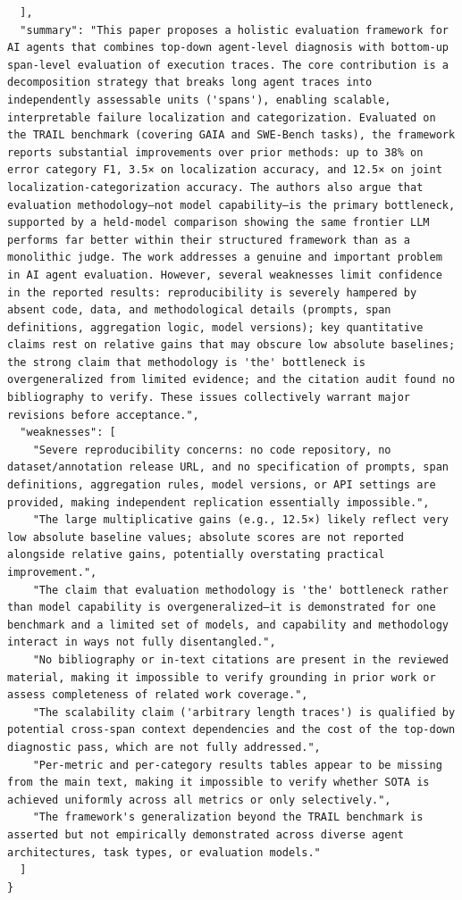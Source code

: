 \documentclass[11pt]{article}
\begin{document}
\begin{verbatim}
  ],
  "summary": "This paper proposes a holistic evaluation framework for AI agents that combines top-down agent-level diagnosis with bottom-up span-level evaluation of execution traces. The core contribution is a decomposition strategy that breaks long agent traces into independently assessable units ('spans'), enabling scalable, interpretable failure localization and categorization. Evaluated on the TRAIL benchmark (covering GAIA and SWE-Bench tasks), the framework reports substantial improvements over prior methods: up to 38% on error category F1, 3.5× on localization accuracy, and 12.5× on joint localization-categorization accuracy. The authors also argue that evaluation methodology—not model capability—is the primary bottleneck, supported by a held-model comparison showing the same frontier LLM performs far better within their structured framework than as a monolithic judge. The work addresses a genuine and important problem in AI agent evaluation. However, several weaknesses limit confidence in the reported results: reproducibility is severely hampered by absent code, data, and methodological details (prompts, span definitions, aggregation logic, model versions); key quantitative claims rest on relative gains that may obscure low absolute baselines; the strong claim that methodology is 'the' bottleneck is overgeneralized from limited evidence; and the citation audit found no bibliography to verify. These issues collectively warrant major revisions before acceptance.",
  "weaknesses": [
    "Severe reproducibility concerns: no code repository, no dataset/annotation release URL, and no specification of prompts, span definitions, aggregation rules, model versions, or API settings are provided, making independent replication essentially impossible.",
    "The large multiplicative gains (e.g., 12.5×) likely reflect very low absolute baseline values; absolute scores are not reported alongside relative gains, potentially overstating practical improvement.",
    "The claim that evaluation methodology is 'the' bottleneck rather than model capability is overgeneralized—it is demonstrated for one benchmark and a limited set of models, and capability and methodology interact in ways not fully disentangled.",
    "No bibliography or in-text citations are present in the reviewed material, making it impossible to verify grounding in prior work or assess completeness of related work coverage.",
    "The scalability claim ('arbitrary length traces') is qualified by potential cross-span context dependencies and the cost of the top-down diagnostic pass, which are not fully addressed.",
    "Per-metric and per-category results tables appear to be missing from the main text, making it impossible to verify whether SOTA is achieved uniformly across all metrics or only selectively.",
    "The framework's generalization beyond the TRAIL benchmark is asserted but not empirically demonstrated across diverse agent architectures, task types, or evaluation models."
  ]
}
\end{verbatim}
\end{document}

